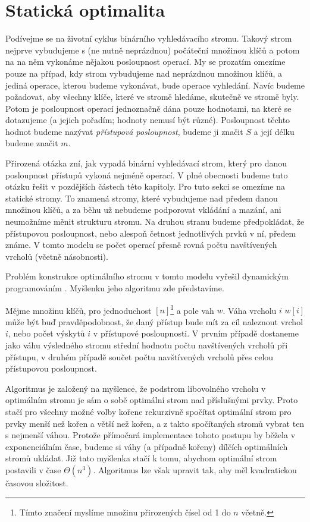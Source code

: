 \section{Statická optimalita}\label{sec:staticoptimality}

Podívejme se na životní cyklus binárního vyhledávacího stromu. Takový strom
nejprve vybudujeme s (ne nutně neprázdnou) počáteční množinou klíčů
a potom na na něm vykonáme nějakou posloupnost operací. My se prozatím omezíme
pouze na případ, kdy strom vybudujeme nad neprázdnou množinou klíčů, a jediná
operace, kterou budeme vykonávat, bude operace vyhledání. Navíc budeme
požadovat, aby všechny klíče, které ve stromě hledáme, skutečně ve stromě byly.
Potom je posloupnost operací jednoznačně dána pouze hodnotami, na které se
dotazujeme (a jejich pořadím; hodnoty nemusí být různé). Posloupnost těchto
hodnot budeme nazývat \emph{přístupová posloupnost}, budeme ji značit $S$ a
její délku budeme značit $m$.

Přirozená otázka zní, jak vypadá binární vyhledávací strom, který pro danou
posloupnost přístupů vykoná nejméně operací. V plné obecnosti budeme tuto otázku řešit v pozdějších částech této kapitoly. Pro tuto sekci se omezíme na statické
stromy. To znamená stromy, které vybudujeme nad předem danou množinou klíčů, a
za běhu už nebudeme podporovat vkládání a mazání, ani neumožníme měnit
strukturu stromu. Na druhou stranu budeme předpokládat, že přístupovou posloupnost, nebo alespoň četnost jednotlivých prvků v ní, předem známe. V tomto modelu se počet operací přesně rovná
počtu navštívených vrcholů (včetně násobnosti).

Problém konstrukce optimálního stromu v tomto modelu vyřešil dynamickým
programováním \citet{staticoptimality}. Myšlenku jeho algoritmu zde představíme.

Mějme množinu klíčů, pro jednoduchost $[n]$\footnote{Tímto značení myslíme
množinu přirozených čísel od 1 do $n$ včetně.} a pole vah $w$. Váha vrcholu
$i$ $w[i]$ může být buď pravděpodobnost, že daný přístup bude mít za
cíl naleznout vrchol $i$, nebo počet výskytů $i$ v přístupové
posloupnosti. V prvním případě dostaneme jako váhu výsledného stromu střední
hodnotu počtu navštívených vrcholů při přístupu, v druhém případě součet počtu navštívených vrcholů přes
celou přístupovou posloupnost.

Algoritmus je založený na myšlence, že podstrom libovolného vrcholu v
optimálním stromu je sám o sobě optimální strom nad příslušnými prvky. Proto
stačí pro všechny možné volby kořene rekurzivně spočítat optimální strom pro
prvky menší než kořen a větší než kořen, a z takto spočítaných stromů vybrat
ten s nejmenší váhou. Protože přímočará implementace tohoto postupu by běžela v
exponenciálním čase, budeme si váhy (a případně kořeny) dílčích optimálních
stromů ukládat. Již tato myšlenka stačí k tomu, abychom optimální strom postavili
v čase $\Theta(n^3)$. Algoritmus lze však upravit tak, aby měl kvadratickou časovou složitost.



